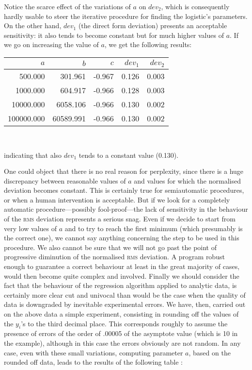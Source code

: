 \documentclass[%
 aip,
 jmp,%
 amsmath,amssymb,
 reprint,%
]{revtex4-1}
\begin{document}
Notice the scarce effect of the variations of $a$ on $dev_2$, which is consequently hardly usable to steer the iterative procedure for finding the logistic's parameters.  On the  other hand, $dev_1$ (the direct form deviation) presents an acceptable sensitivity: it also tends to become constant but for much higher values of  $a$.
If we go on increasing the value of $a$, we get the following results:

{\centering
\begin{tabular}{r@{\hskip 5mm}r@{\hskip 5mm}r@{\hskip 5mm}r@{\hskip 5mm}r}
 $a$ & $b$ & $c$ & $dev_1$ & $dev_2$  \\ \hline
 500.000 & 301.961 & -0.967 & 0.126 & 0.003 \\
 1000.000 & 604.917 & -0.966 & 0.128 & 0.003 \\
 10000.000 & 6058.106 & -0.966 & 0.130 & 0.002 \\
 100000.000	& 60589.991 & -0.966 & 0.130 & 0.002	 
\end{tabular}\\[4mm]}

indicating that also $dev_1$ tends to a constant value (0.130).

One could object  that there is no real reason for perplexity, since there is a huge discrepancy between reasonable values of $a$ and values for which the normalised deviation becomes constant. This is certainly true for semiautomatic procedures,  or  when a human intervention is acceptable.
But if we look for a completely automatic procedure---possibly fool-proof---the lack of sensitivity in  the  behaviour  of  the  \textsc{rms} deviation represents a serious snag.
Even if we decide to start from very low values of $a$ and to try to reach the first minimum (which presumably is the correct one), we cannot say anything concerning the step to be  used in this procedure. We  also cannot be sure that  we  will not go past the point of progressive diminution of the normalised \textsc{rms} deviation. A program robust enough to guarantee a correct behaviour at least in the great majority of cases, would then become quite complex and involved.
Finally we should consider the fact that the behaviour of the regression algorithm applied to analytic data, is certainly more clear cut and univocal than would be the case when the quality of data is downgraded by inevitable experimental errors.
We have,  then, carried  out  on the  above data a simple experiment, consisting in rounding off the values of the $y_i$'s to the third decimal place.
This corresponds roughly to assume the presence of errors of the order of .00005 of the asymptote value (which is	10 in the  example), although in this case the errors obviously are not random.
In any case, even with these small variations, computing parameter $a$, based on the rounded off data, leads to the results of the following table :
\end{document}
